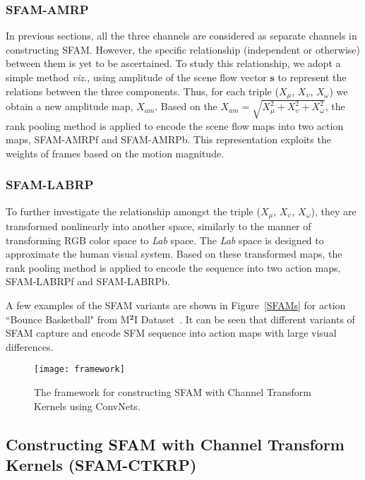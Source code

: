 \documentclass[10pt,twocolumn,letterpaper]{article}
\begin{document}
\subsubsection{SFAM-AMRP}

In previous sections, all the three channels are considered as separate 
channels in constructing SFAM. However, the specific relationship (independent 
or otherwise) between them is yet to be ascertained. To study this 
relationship, we adopt a simple method \textit{viz.}, using amplitude of the 
scene flow vector $\textbf{s}$ to represent the relations between the three 
components. Thus, for each triple ($X_{\mu}$, $X_{\upsilon}$, $X_{\omega}$) we 
obtain a new amplitude map, $X_{am}$. Based on the $X_{am} = \sqrt{X_{\mu}^{2} 
+ X_{\upsilon}^{2} + X_{\omega}^{2}}$, the rank pooling method is applied to 
encode the scene flow maps into two action maps, SFAM-AMRPf and SFAM-AMRPb. This 
representation exploits the weights of frames based on the motion magnitude.

\subsubsection{SFAM-LABRP}

To further investigate the relationship amongst the triple ($X_{\mu}$, 
$X_{\upsilon}$,  $X_{\omega}$), they are transformed nonlinearly into another 
space, similarly to the manner of transforming RGB color space to \textit{Lab} 
space. The \textit{Lab} space is designed to approximate the human visual 
system.  Based on these transformed maps, the rank pooling method is applied to 
encode the sequence into two action maps, SFAM-LABRPf and SFAM-LABRPb. 

A few examples of the SFAM variants are shown in Figure~\ref{SFAMs} 
for action ``Bounce Basketball" from M$^{\textbf{2}}$I 
Dataset~\cite{liu2016benchmarking}. It can be seen that different variants of 
SFAM capture and encode SFM sequence into action maps with large visual 
differences.

\begin{figure}[t]
\begin{center}
{\texttt{[image: framework]}}
\end{center}
\caption{The framework for constructing SFAM with Channel Transform Kernels using ConvNets. }
\label{framework}
\end{figure}


\subsection{Constructing SFAM with Channel Transform Kernels (SFAM-CTKRP)}\label{sfam-learning}
\end{document}
